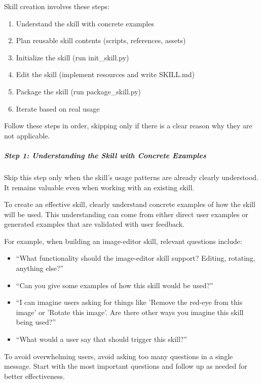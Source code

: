 \documentclass[11pt]{article}
\begin{document}
Skill creation involves these steps:


\begin{enumerate}[leftmargin=*,itemsep=2pt,topsep=2pt]
\item {} Understand the skill with concrete examples
\item {} Plan reusable skill contents (scripts, references, assets)
\item {} Initialize the skill (run init\_\allowbreak{}skill.py)
\item {} Edit the skill (implement resources and write SKILL.md)
\item {} Package the skill (run package\_\allowbreak{}skill.py)
\item {} Iterate based on real usage
\end{enumerate}

Follow these steps in order, skipping only if there is a clear reason why they are not applicable.


\subparagraph{Step 1: Understanding the Skill with Concrete Examples}\mbox{}\par

Skip this step only when the skill's usage patterns are already clearly understood. It remains valuable even when working with an existing skill.


To create an effective skill, clearly understand concrete examples of how the skill will be used. This understanding can come from either direct user examples or generated examples that are validated with user feedback.


For example, when building an image-editor skill, relevant questions include:


\begin{itemize}[leftmargin=*,itemsep=2pt,topsep=2pt]
\item {} ``What functionality should the image-editor skill support? Editing, rotating, anything else?''
\item {} ``Can you give some examples of how this skill would be used?''
\item {} ``I can imagine users asking for things like 'Remove the red-eye from this image' or 'Rotate this image'. Are there other ways you imagine this skill being used?''
\item {} ``What would a user say that should trigger this skill?''
\end{itemize}

To avoid overwhelming users, avoid asking too many questions in a single message. Start with the most important questions and follow up as needed for better effectiveness.
\end{document}
